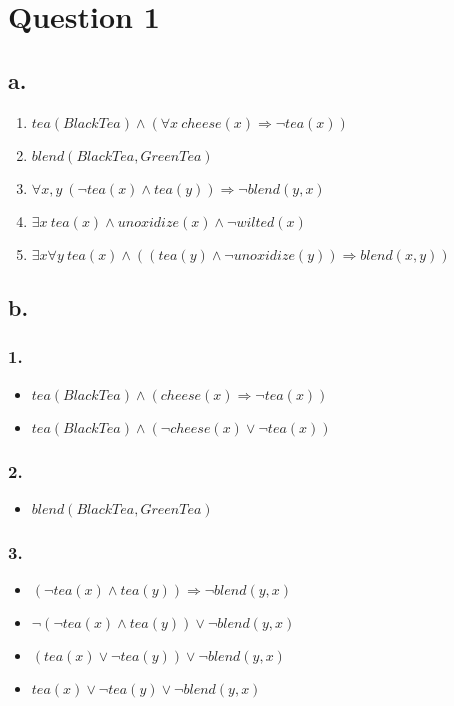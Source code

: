 \documentclass[11pt]{article}
\author{DESKTOP-OEFS7VE}
\date{\today}
\title{}
\begin{document}
\tableofcontents

\section{Question 1}
\label{sec:org653e72f}
\subsection{a.}
\label{sec:org5f651a4}
\begin{enumerate}
\item \(tea(BlackTea) \land (\forall x \:cheese(x) \Rightarrow \lnot tea(x))\)
\item \(blend(BlackTea, GreenTea)\)
\item \(\forall x,y \: (\lnot tea(x) \land tea(y)) \Rightarrow \lnot blend(y,x)\)
\item \(\exists x \: tea(x) \land unoxidize(x) \land \lnot wilted(x)\)
\item \(\exists x \forall y \: tea(x) \land ((tea(y) \land \lnot unoxidize(y)) \Rightarrow blend(x,y))\)
\end{enumerate}
\subsection{b.}
\label{sec:org3970bfb}
\subsubsection{1.}
\label{sec:org982a5d9}
\begin{itemize}
\item \(tea(BlackTea) \land (cheese(x) \Rightarrow \lnot tea(x))\)
\item \(tea(BlackTea) \land (\lnot cheese(x) \lor \lnot tea(x))\)
\end{itemize}
\subsubsection{2.}
\label{sec:org10a0c9b}
\begin{itemize}
\item \(blend(BlackTea, GreenTea)\)
\end{itemize}
\subsubsection{3.}
\label{sec:org2a3240a}
\begin{itemize}
\item \((\lnot tea(x) \land tea(y)) \Rightarrow \lnot blend(y,x)\)
\item \(\lnot(\lnot tea(x) \land tea(y)) \lor \lnot blend(y,x)\)
\item \((tea(x) \lor \lnot tea(y)) \lor \lnot blend(y,x)\)
\item \(tea(x) \lor \lnot tea(y) \lor \lnot blend(y,x)\)
\end{itemize}
\end{document}
